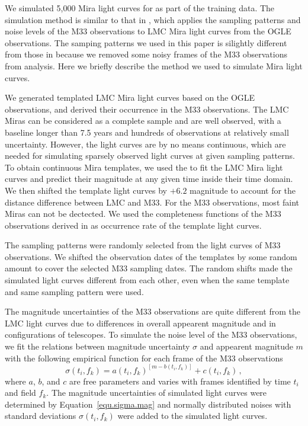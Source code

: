 We simulated 5,000 Mira light curves for as part of the training data. The simulation method is similar to that in , which applies the sampling patterns and noise levels of the M33 observations to LMC Mira light curves from the OGLE observations. The samping patterns we used in this paper is silightly different from those in  because we removed some noisy frames of the M33 observations from analysis. Here we briefly describe the method we used to simulate Mira light curves.

We generated templated LMC Mira light curves based on the OGLE observations, and derived their occurrence in the M33 observations. The LMC Miras can be considered as a complete sample and are well observed, with a baseline longer than 7.5 years and hundreds of observations at relatively small uncertainty. However, the light curves are by no means continuous, which are needed for simulating sparsely observed light curves at given sampling patterns. To obtain continuous Mira templates, we used the  to fit the LMC Mira light curves and predict their magnitude at any given time inside their time domain. We then shifted the template light curves by $+6.2$ magnitude to account for the distance difference between LMC and M33. For the M33 observations, most faint Miras can not be dectected. We used the completeness functions of the M33 observations derived in  as occurrence rate of the template light curves.

The sampling patterns were randomly selected from the light curves of M33 observations. We shifted the observation dates of the templates by some random amount to cover the selected M33 sampling dates. The random shifts made the simulated light curves different from each other, even when the same template and same sampling pattern were used.

The magnitude uncertainties of the M33 observations are quite different from the LMC light curves due to differences in overall appearent magnitude and in configurations of telescopes. To simulate the noise level of the M33 observations, we fit the relations between magnitude uncertainty $\sigma$ and appearent magnitude $m$ with the following empirical function for each frame of the M33 observations
\begin{equation}
\sigma(t_i,f_k) = a(t_i,f_k)^{[m-b(t_i,f_k)]} + c(t_i,f_k)\,, \label{equ.sigma.mag}
\end{equation}
where $a$, $b$, and $c$ are free parameters and varies with frames identified by time $t_i$ and field $f_k$. The magnitude uncertainties of simulated light curves were determined by Equation~\ref{equ.sigma.mag} and normally distributed noises with standard deviations $\sigma(t_i,f_k)$ were added to the simulated light curves.